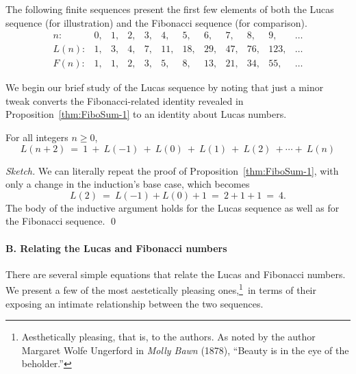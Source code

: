 \medskip

The following finite sequences present the first few elements of both
the Lucas sequence (for illustration) and the Fibonacci sequence
(for comparison).
\[
\begin{array}{r|rrrrrrrrrrr}
n: &
 0, & 1, & 2, & 3, &  4, &  5, &  6, &  7, &  8, &   9, & \ldots \\
\hline
L(n): &
 1, & 3, & 4, & 7, & 11, & 18, & 29, & 47, & 76, & 123, & \ldots \\
F(n): &
 1, & 1, & 2, & 3, &  5, &  8, & 13, & 21, & 34, &  55, & \ldots
\end{array}
\]

We begin our  brief study of the Lucas sequence by noting that just a
minor tweak converts the Fibonacci-related identity revealed in
Proposition~\ref{thm:FiboSum-1} to an identity about Lucas numbers.

\begin{prop}
\label{thm:LucasSum-1}
For all integers $n \geq 0$,
\begin{equation}
\label{eq:multilinear-Lucas-1}
L(n+2) \ = \
1 \ + \ L(-1) \ + \ L(0) \ + \ L(1) \ + \ L(2) \ + \cdots + \ L(n)
\end{equation}
\end{prop}

\begin{proof}[Sketch]
We can literally repeat the proof of Proposition~\ref{thm:FiboSum-1},
with only a change in the induction's base case, which becomes
\[ L(2) \ = \ L(-1) + L(0) + 1 \ = \ 2 + 1 + 1 \ = \ 4. \]
The body of the inductive argument holds for the Lucas sequence as
well as for the Fibonacci sequence.
\qed
\end{proof}

\paragraph{\small\sf B. Relating the Lucas and Fibonacci numbers}

There are several simple equations that relate the Lucas and Fibonacci
numbers.  We present a few of the most aestetically pleasing
ones,\footnote{Aesthetically pleasing, that is, to the authors.  As
  noted by the author Margaret Wolfe Ungerford in {\it Molly Bawn}
  (1878),\index{Ungerford, Margaret Wolfe} ``Beauty is in the eye of
  the beholder.''}~in terms of their exposing an intimate
relationship between the two sequences.

